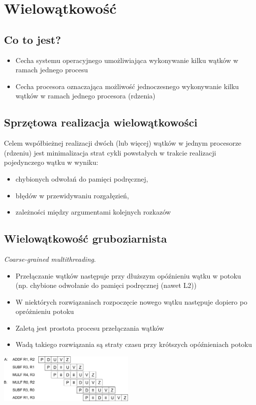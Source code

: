 \section{Wielowątkowość}
	\subsection{Co to jest?}
		\begin{itemize}
			\item Cecha systemu operacyjnego umożliwiająca wykonywanie kilku wątków w ramach jednego procesu
			\item Cecha procesora oznaczająca możliwość jednoczesnego wykonywanie kilku wątków w ramach jednego procesora (rdzenia)
		\end{itemize}
	\subsection{Sprzętowa realizacja wielowątkowości}
		Celem współbieżnej realizacji dwóch (lub więcej) wątków w jednym procesorze (rdzeniu) jest minimalizacja strat cykli powstałych w trakcie realizacji pojedynczego wątku w wyniku:
		\begin{itemize}
			\item chybionych odwołań do pamięci podręcznej,
			\item błędów w przewidywaniu rozgałęzień,
			\item zależności między argumentami kolejnych rozkazów
		\end{itemize}
	\subsection{Wielowątkowość gruboziarnista}
		\emph{Coarse-grained multithreading}.
		\begin{itemize}
			\item Przełączanie wątków następuje przy dłuższym opóźnieniu wątku w potoku (np. chybione odwołanie do pamięci podręcznej (nawet L2))
			\item W niektórych rozwiązaniach rozpoczęcie nowego wątku następuje dopiero po opróżnieniu potoku
			\item Zaletą jest prostota procesu przełączania wątków
			\item Wadą takiego rozwiązania są straty czasu przy krótszych opóźnieniach potoku
		\end{itemize}
		\begin{center}
			\vspace{0.3cm}
			\includegraphics[width=0.5\textwidth]{./images/wielowatkowosc01}
		\end{center}

